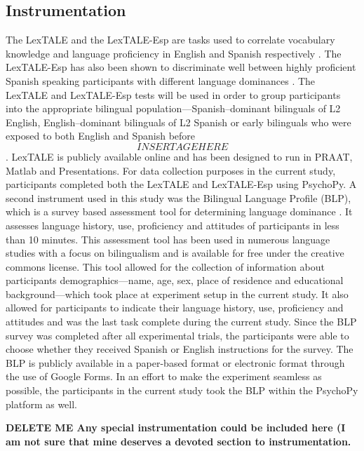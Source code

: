\subsection{Instrumentation}
The LexTALE and the LexTALE-Esp are tasks used to correlate vocabulary knowledge and language proficiency in English and Spanish respectively \citep{Izura2014-yw,Lemhofer2012-hz}. The LexTALE-Esp has also been shown to discriminate well between highly proficient Spanish speaking participants with different language dominances \citep{Ferre2017-jq}. The LexTALE and LexTALE-Esp tests will be used in order to group participants into the appropriate bilingual population—Spanish–dominant bilinguals of L2 English, English–dominant bilinguals of L2 Spanish or early bilinguals who were exposed to both English and Spanish before \[INSERT AGE HERE\]. LexTALE is publicly available online and has been designed to run in PRAAT, Matlab and Presentations. For data collection purposes in the current study, participants completed both the LexTALE and LexTALE-Esp using PsychoPy. 
A second instrument used in this study was the Bilingual Language Profile (BLP), which is a survey based assessment tool for determining language dominance \citep{Birdsong2012-wd}. It assesses language history, use, proficiency and attitudes of participants in less than 10 minutes. This assessment tool has been used in numerous language studies with a focus on bilingualism and is available for free under the creative commons license. This tool allowed for the collection of information about participants demographics---name, age, sex, place of residence and educational background---which took place at experiment setup in the current study. It also allowed for participants to indicate their language history, use, proficiency and attitudes and was the last task complete during the current study. Since the BLP survey was completed after all experimental trials, the participants were able to choose whether they received Spanish or English instructions for the survey. The BLP is publicly available in a paper-based format or electronic format through the use of Google Forms. In an effort to make the experiment seamless as possible, the participants in the current study took the BLP within the PsychoPy platform as well. 


\textbf{DELETE ME Any special instrumentation could be included here (I am not sure that mine deserves a devoted section to instrumentation.}



